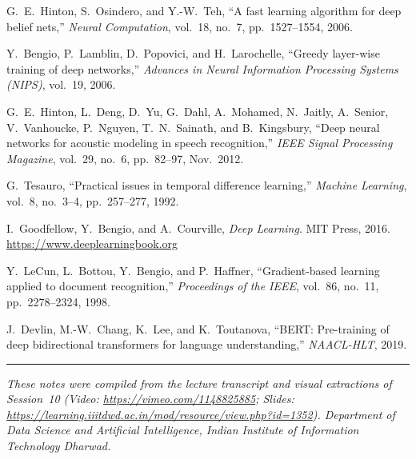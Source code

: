 \documentclass[12pt,a4paper]{article}
\begin{document}
\begin{enumerate}[leftmargin=*, label={[\arabic*]}]

  \item G.\ E.\ Hinton, S.\ Osindero, and Y.-W.\ Teh, ``A fast learning
        algorithm for deep belief nets,'' \textit{Neural Computation},
        vol.\ 18, no.\ 7, pp.\ 1527--1554, 2006.

  \item Y.\ Bengio, P.\ Lamblin, D.\ Popovici, and H.\ Larochelle,
        ``Greedy layer-wise training of deep networks,''
        \textit{Advances in Neural Information Processing Systems (NIPS)},
        vol.\ 19, 2006.

  \item G.\ E.\ Hinton, L.\ Deng, D.\ Yu, G.\ Dahl, A.\ Mohamed,
        N.\ Jaitly, A.\ Senior, V.\ Vanhoucke, P.\ Nguyen, T.\ N.\ Sainath,
        and B.\ Kingsbury,
        ``Deep neural networks for acoustic modeling in speech recognition,''
        \textit{IEEE Signal Processing Magazine}, vol.\ 29, no.\ 6,
        pp.\ 82--97, Nov.\ 2012.

  \item G.\ Tesauro, ``Practical issues in temporal difference learning,''
        \textit{Machine Learning}, vol.\ 8, no.\ 3--4, pp.\ 257--277, 1992.

  \item I.\ Goodfellow, Y.\ Bengio, and A.\ Courville,
        \textit{Deep Learning}. MIT Press, 2016.
        \url{https://www.deeplearningbook.org}

  \item Y.\ LeCun, L.\ Bottou, Y.\ Bengio, and P.\ Haffner,
        ``Gradient-based learning applied to document recognition,''
        \textit{Proceedings of the IEEE}, vol.\ 86, no.\ 11,
        pp.\ 2278--2324, 1998.

  \item J.\ Devlin, M.-W.\ Chang, K.\ Lee, and K.\ Toutanova,
        ``BERT: Pre-training of deep bidirectional transformers for
        language understanding,'' \textit{NAACL-HLT}, 2019.

\end{enumerate}

\vspace{2em}
\hrule
\vspace{0.5em}
\noindent\small\textit{These notes were compiled from the lecture transcript
and visual extractions of Session~10 (Video: \url{https://vimeo.com/1148825885};
Slides: \url{https://learning.iiitdwd.ac.in/mod/resource/view.php?id=1352}).
Department of Data Science and Artificial Intelligence,
Indian Institute of Information Technology Dharwad.}

\clearpage
\end{document}
